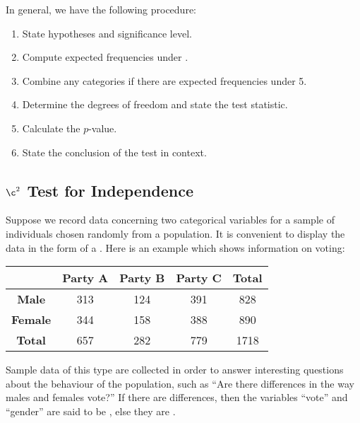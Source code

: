 In general, we have the following procedure:

\begin{recipe}
    \phantom{.}
    \renewcommand{\theenumi}{\arabic{enumi}.}
    \begin{enumerate}
        \item State hypotheses and significance level.
        \item Compute expected frequencies under \nullhyp{}.
        \item Combine any categories if there are expected frequencies under 5.
        \item Determine the degrees of freedom and state the test statistic.
        \item Calculate the $p$-value.
        \item State the conclusion of the test in context.
    \end{enumerate}
    \renewcommand{\theenumi}{(\alph{enumi})}
\end{recipe}

\subsection{\texorpdfstring{$\c^2$}{Chi-Squared} Test for Independence}

Suppose we record data concerning two categorical variables for a sample of individuals chosen randomly from a population. It is convenient to display the data in the form of a . Here is an example which shows information on voting:

\begin{table}[H]
    \centering
    \begin{tabular}{|c|c|c|c|c|}
    \hline
     & \textbf{Party A} & \textbf{Party B} & \textbf{Party C} & \textbf{Total} \\ \hline
    \textbf{Male} & 313 & 124 & 391 & 828 \\ \hline
    \textbf{Female} & 344 & 158 & 388 & 890 \\ \hline
    \textbf{Total} &  657 & 282 & 779 & 1718 \\ \hline
    \end{tabular}
\end{table}

Sample data of this type are collected in order to answer interesting questions about the behaviour of the population, such as ``Are there differences in the way males and females vote?'' If there are differences, then the variables ``vote'' and ``gender'' are said to be , else they are .

